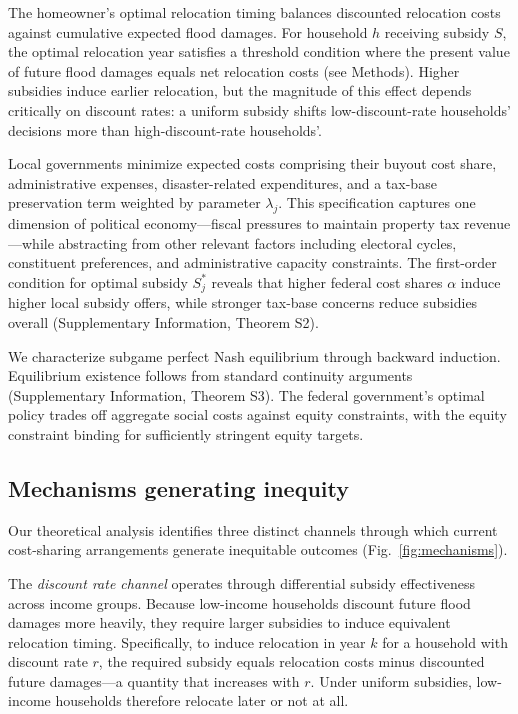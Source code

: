 \documentclass[11pt,letterpaper]{article}
\theoremstyle{definition}
\begin{document}
The homeowner's optimal relocation timing balances discounted relocation costs against cumulative expected flood damages. For household $h$ receiving subsidy $S$, the optimal relocation year satisfies a threshold condition where the present value of future flood damages equals net relocation costs (see Methods). Higher subsidies induce earlier relocation, but the magnitude of this effect depends critically on discount rates: a uniform subsidy shifts low-discount-rate households' decisions more than high-discount-rate households'.

Local governments minimize expected costs comprising their buyout cost share, administrative expenses, disaster-related expenditures, and a tax-base preservation term weighted by parameter $\lambda_j$. This specification captures one dimension of political economy---fiscal pressures to maintain property tax revenue---while abstracting from other relevant factors including electoral cycles, constituent preferences, and administrative capacity constraints. The first-order condition for optimal subsidy $S_j^*$ reveals that higher federal cost shares $\alpha$ induce higher local subsidy offers, while stronger tax-base concerns reduce subsidies overall (Supplementary Information, Theorem S2).

We characterize subgame perfect Nash equilibrium through backward induction. Equilibrium existence follows from standard continuity arguments (Supplementary Information, Theorem S3). The federal government's optimal policy trades off aggregate social costs against equity constraints, with the equity constraint binding for sufficiently stringent equity targets.

\subsection*{Mechanisms generating inequity}

Our theoretical analysis identifies three distinct channels through which current cost-sharing arrangements generate inequitable outcomes (Fig.~\ref{fig:mechanisms}).

The \textit{discount rate channel} operates through differential subsidy effectiveness across income groups. Because low-income households discount future flood damages more heavily, they require larger subsidies to induce equivalent relocation timing. Specifically, to induce relocation in year $k$ for a household with discount rate $r$, the required subsidy equals relocation costs minus discounted future damages---a quantity that increases with $r$. Under uniform subsidies, low-income households therefore relocate later or not at all.
\end{document}
